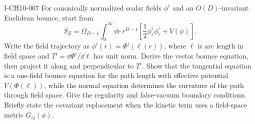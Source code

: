 \begin{exercise}{I-CH10-007}
For canonically normalized scalar fields $\phi^i$ and an $O(D)$-invariant
Euclidean bounce, start from
\[
  S_E=\Omega_{D-1}\int_0^\infty\dd r\,r^{D-1}
  \left[\frac12\phi_r^i\phi_r^i+V(\phi)\right].
\]
Write the field trajectory as $\phi^i(r)=\Phi^i(\ell(r))$, where $\ell$ is arc
length in field space and $T^i=\dd\Phi^i/\dd\ell$ has unit norm.  Derive the
vector bounce equation, then project it along and perpendicular to $T^i$.
Show that the tangential equation is a one-field bounce equation for the path
length with effective potential $V(\Phi(\ell))$, while the normal equation
determines the curvature of the path through field space.  Give the regularity
and false-vacuum boundary conditions.  Briefly state the covariant replacement
when the kinetic term uses a field-space metric $G_{ij}(\phi)$.
\end{exercise}
